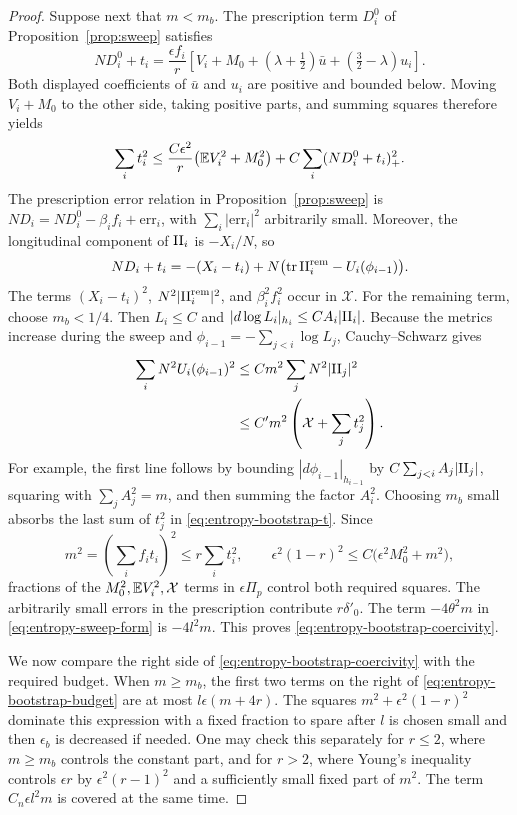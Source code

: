 \begin{proof}
Suppose next that \(m<m_b\).  The prescription term \(D_i^0\) of
Proposition~\ref{prop:sweep} satisfies
\[
 ND_i^0+t_i=\frac{\epsilon f_i}{r}
 \left[V_i+M_0+(\lambda+\tfrac12)\bar u+
                    (\tfrac32-\lambda)u_i\right].
\]
Both displayed coefficients of \(\bar u\) and \(u_i\) are positive and
bounded below.  Moving \(V_i+M_0\) to the other side, taking positive
parts, and summing squares therefore yields
\begin{equation}\label{eq:entropy-bootstrap-t}
 \sum_i t_i^2\leq
 \frac{C\epsilon^2}{r}\bigl(\mathbb E V_i^2+M_0^2\bigr)
       +C\sum_i(ND_i^0+t_i)_+^2 .
\end{equation}
The prescription error relation in Proposition~\ref{prop:sweep} is
\(ND_i=ND_i^0-\beta_i f_i+\mathrm{err}_i\), with
\(\sum_i|\mathrm{err}_i|^2\) arbitrarily small.  Moreover, the
longitudinal component of \(\mathrm{II}_i\) is \(-X_i/N\), so
\[
 ND_i+t_i=-(X_i-t_i)
       +N\bigl(\operatorname{tr}\mathrm{II}_i^{\mathrm{rem}}-U_i(\phi_{i-1})\bigr).
\]
The terms \((X_i-t_i)^2\), \(N^2|\mathrm{II}_i^{\mathrm{rem}}|^2\), and
\(\beta_i^2f_i^2\) occur in \(\mathcal X\).
For the remaining term, choose \(m_b<1/4\).  Then
\(L_i\leq C\) and \(|d\log L_i|_{h_i}\leq C A_i|\mathrm{II}_i|\).
Because the metrics increase during the sweep and
\(\phi_{i-1}=-\sum_{j<i}\log L_j\), Cauchy--Schwarz gives
\[
\begin{split}
 \sum_iN^2U_i(\phi_{i-1})^2
 &\leq C m^2\sum_jN^2|\mathrm{II}_j|^2\\
 &\leq C' m^2\left(\mathcal X+\sum_jt_j^2\right).
\end{split}
\]
For example, the first line follows by bounding
\(|d\phi_{i-1}|_{h_{i-1}}\) by
\(C\sum_{j<i}A_j|\mathrm{II}_j|\), squaring with
\(\sum_jA_j^2=m\), and then summing the factor \(A_i^2\).
Choosing \(m_b\) small absorbs the last sum of \(t_j^2\) in
\eqref{eq:entropy-bootstrap-t}.  Since
\[
 m^2=\left(\sum_i f_i t_i\right)^2\leq r\sum_i t_i^2,
 \qquad
 \epsilon^2(1-r)^2\leq C\bigl(\epsilon^2M_0^2+m^2\bigr),
\]
fractions of the \(M_0^2,\mathbb E V_i^2,\mathcal X\) terms in
\(\epsilon\Pi_p\) control both required squares.  The arbitrarily
small errors in the prescription contribute \(r\delta'_0\).
The term \(-4\theta^2m\) in \eqref{eq:entropy-sweep-form} is
\(-4l^2m\).  This proves \eqref{eq:entropy-bootstrap-coercivity}.

We now compare the right side of
\eqref{eq:entropy-bootstrap-coercivity} with the required budget.
When \(m\geq m_b\), the first two terms on the right of
\eqref{eq:entropy-bootstrap-budget} are at most
\(l\epsilon(m+4r)\).  The squares
\(m^2+\epsilon^2(1-r)^2\) dominate this expression with a fixed
fraction to spare after \(l\) is chosen small and then \(\epsilon_b\)
is decreased if needed.  One may check this separately for \(r\leq2\),
where \(m\geq m_b\) controls the constant part, and for \(r>2\), where
Young's inequality controls \(\epsilon r\) by
\(\epsilon^2(r-1)^2\) and a sufficiently small fixed part of \(m^2\).
The term \(C_n\epsilon l^2m\) is covered at the same time.


\end{proof}
